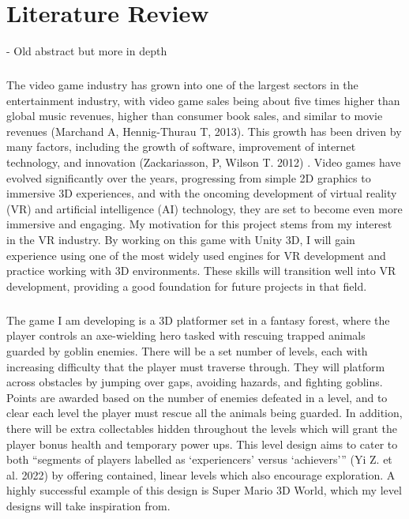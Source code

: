 \documentclass[]{final_report}
\begin{document}
\chapter{Literature Review}
- Old abstract but more in depth
\paragraph{}
The video game industry has grown into one of the largest sectors in the entertainment industry, with video game sales being about five times higher than global music revenues, higher than consumer book sales, and similar to movie revenues (Marchand A, Hennig-Thurau T, 2013). This growth has been driven by many factors, including the growth of software, improvement of internet technology, and innovation (Zackariasson, P, Wilson T. 2012) . Video games have evolved significantly over the years, progressing from simple 2D graphics to immersive 3D experiences, and with the oncoming development of virtual reality (VR) and artificial intelligence (AI) technology, they are set to become even more immersive and engaging.
My motivation for this project stems from my interest in the VR industry. By working on this game with Unity 3D, I will gain experience using one of the most widely used engines for VR development and practice working with 3D environments. These skills will transition well into VR development, providing a good foundation for future projects in that field.
\paragraph{}
The game I am developing is a 3D platformer set in a fantasy forest, where the player controls an axe-wielding hero tasked with rescuing trapped animals guarded by goblin enemies. There will be a set number of levels, each with increasing difficulty that the player must traverse through. They will platform across obstacles by jumping over gaps, avoiding hazards, and fighting goblins. Points are awarded based on the number of enemies defeated in a level, and to clear each level the player must rescue all the animals being guarded. In addition, there will be extra collectables hidden throughout the levels which will grant the player bonus health and temporary power ups. This level design aims to cater to both ``segments of players labelled as `experiencers' versus `achievers''' (Yi Z. et al. 2022) by offering contained, linear levels which also encourage exploration. A highly successful example of this design is Super Mario 3D World, which my level designs will take inspiration from.
\end{document}
